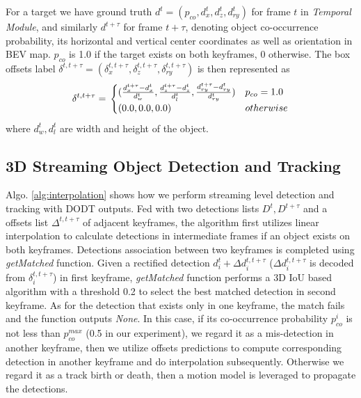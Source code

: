 \documentclass[letterpaper, 10pt, conference]{ieeeconf}  %
\begin{document}
For a target we have ground truth $d^t = (p_{co}, d^t_x, d^t_z, d^t_{ry})$ for frame $t$ in \textit{Temporal Module}, and similarly $d^{t+\tau}$ for frame $t+\tau$, denoting object co-occurrence probability, its horizontal and vertical center coordinates as well as orientation in BEV map. $p_{co}$ is 1.0 if the target exists on both keyframes, 0 otherwise. The box offsets label $\delta^{t, t+\tau} = (\delta^{t,t+\tau}_{x}, \delta^{t,t+\tau}_{z}, \delta^{t,t+\tau}_{ry})$ is then represented as
\begin{equation}
\delta^{t, t+\tau} = \\
\begin{cases}
(\frac{d_{x}^{t+\tau} - d_{x}^{t}}{d^t_{w}}, \frac{d_{z}^{t+\tau} - d_{z}^{t} }{d^t_{l}}, \frac{d_{ry}^{t+\tau} - d_{ry}^{t}}{d^t_{ry}}) & p_{co} = 1.0 \\
(0.0,0.0, 0.0) &  otherwise
\end{cases}
\end{equation}
where $d^t_{w}, d^t_{l}$ are width and height of the object.

\subsection{3D Streaming Object Detection and Tracking} 
Algo. \ref{alg:interpolation} shows how we perform streaming level detection and tracking with DODT outputs. Fed with two detections lists $D^t, D^{t+\tau}$ and a offsets list $\Delta^{t, t+\tau}$ of adjacent keyframes, the algorithm first utilizes linear interpolation to calculate detections in intermediate frames if an object exists on both keyframes. Detections association between two keyframes is completed using \textit{getMatched} function.  Given a rectified detection $d_i^t + \Delta d^{t, t+ \tau}_{i}$ ($\Delta d^{t, t+ \tau}_{i}$ is decoded from $\delta^{t, t+\tau}_i$) in first keyframe, \textit{getMatched} function performs a 3D IoU based algorithm with a threshold 0.2 to select the best matched detection in second keyframe. As for the detection that exists only in one keyframe, the match fails and the function outputs \textit{None}. In this case, if its co-occurrence probability $p_{co}^i$ is not less than $p_{co}^{max}$ (0.5 in our experiment), we regard it as a mis-detection in another keyframe, then we utilize offsets predictions to compute corresponding detection in another keyframe and do interpolation subsequently. Otherwise we regard it as a track birth or death, then a motion model is leveraged to propagate the detections.
\end{document}
